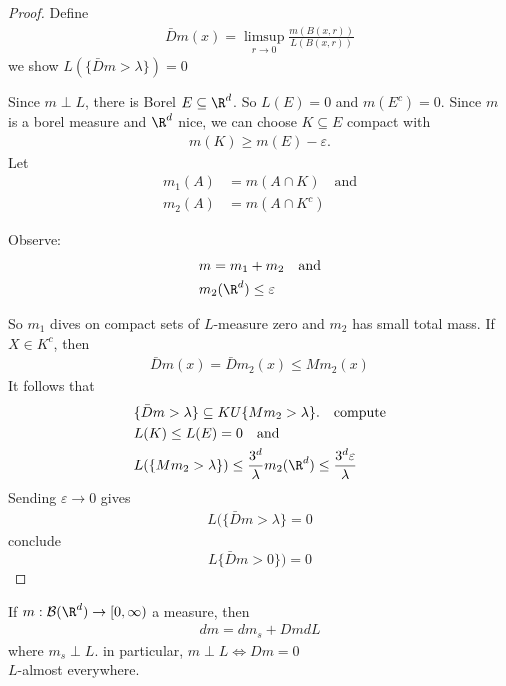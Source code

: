 \begin{proof}
	Define
	\begin{align*}
		\bar{D} m(x) = \limsup_{r \to 0} \frac{m(B(x,r))}{L(B(x,r))}
	\end{align*}
we show $L( \{ \bar{D}m > \lambda \}) = 0$

Since $m \perp L$, there is Borel $E \subseteq \R^d$. So $L(E) = 0$ and $m(E^c) = 0$.
Since  $m$ is a borel measure and $\R^d$ nice, we can choose $K \subseteq  E$ compact with
\begin{align*}
	m(K) \geq m(E) - \varepsilon.
\end{align*}
Let
\begin{align*}
	m_1 (A) &= m(A \cap K) \quad \text{and} \\
	m_2 (A)	&= m( A \cap K^c)
\end{align*}

Observe:
\begin{align*}
	&m = m_1 + m_2 \quad \text{and} \\
	&m_2(\R^d)\leq \varepsilon
\end{align*}

So $m_1$ dives on compact sets of $L$-measure zero and $m_2$ has small total mass.
If $X \in K^c$, then
\begin{align*}
	\bar{D}m(x) = \bar D m_2 (x) \leq M m_2 (x)
\end{align*}
It follows that
\begin{align*}
	&\{ \bar{D} m > \lambda \} \subseteq  K U \{ M m_2 > \lambda \}. \quad \text{compute} \\
	&L (K) \leq L(E) = 0 \quad \text{and} \\
	&L (\{ M m_2 > \lambda \}) \leq \frac{3^d}{\lambda} m_2 (\R^d) \leq \frac{3^d \varepsilon}{\lambda}
\end{align*}
Sending $\varepsilon \to 0$ gives
\begin{align*}
	L ( \{ \bar{D} m > \lambda \} = 0
\end{align*}
conclude
\[
	L\{ \bar{D} m > 0 \}) = 0
\]
\end{proof}


\begin{corollary}
	If $m : \mathcal{B}(\R^d) \to [0, \infty)$ a measure, then
	\begin{align*}
		dm = dm_{s} + Dm dL
	\end{align*} where $m_s \perp L$. in particular, $m \perp L \iff Dm = 0$ \\
	$L$-almost everywhere.
\end{corollary}


